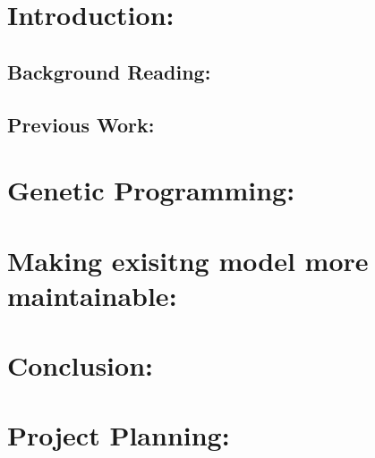 \documentclass{article}
\begin{document}
\newpage

\tableofcontents 

\newpage

\section{Introduction: }

\subsection{Background Reading: }

\subsection{Previous Work: }

\section{Genetic Programming: }

\section{Making exisitng model more maintainable: }

\section{Conclusion:}


 



\section{Project Planning: }
\end{document}
